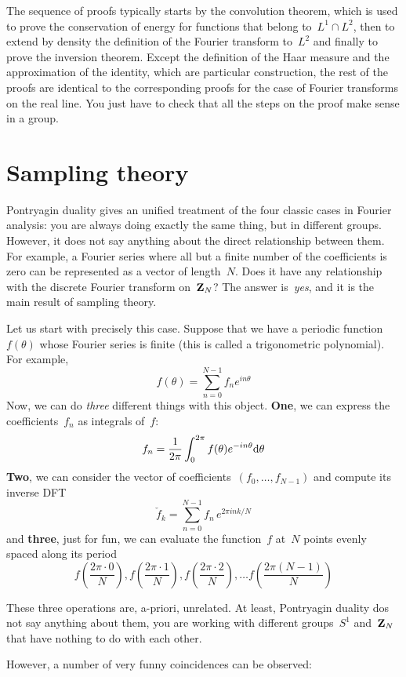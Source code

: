 The sequence of proofs typically starts by the convolution theorem,
which is used to prove the conservation of energy for functions that
belong to~$L^1\cap L^2$, then to extend by density the definition of
the Fourier transform to~$L^2$ and finally to prove the inversion
theorem.  Except the definition of the Haar measure and the
approximation of the identity, which are particular construction, the
rest of the proofs are identical to the corresponding proofs for the
case of Fourier transforms on the real line.  You just have to check
that all the steps on the proof make sense in a group.


\section{Sampling theory}

Pontryagin duality gives an unified treatment of the four classic
cases in Fourier analysis: you are always doing exactly the same
thing, but in different groups.  However, it does not say anything
about the direct relationship between them.  For example, a Fourier
series where all but a finite number of the coefficients is zero can
be represented as a vector of length~$N$.  Does it have any
relationship with the discrete Fourier transform on~$\mathbf{Z}_N$?  The
answer is~\emph{yes}, and it is the main result of sampling theory.

Let us start with precisely this case.  Suppose that we have a
periodic function~$f(\theta)$ whose Fourier series is finite (this is
called a trigonometric polynomial).  For
example,
$$
f(\theta)=\sum_{n=0}^{N-1} f_ne ^{in\theta}
$$
Now, we can do \emph{three} different things with this object.  {\bf
One}, we can express the coefficients~$f_n$ as integrals of~$f$:
$$
f_n = \frac{1}{2\pi}\int_0^{2\pi} f(\theta)e^{-in\theta}\mathrm{d}\theta
$$
{\bf Two}, we can consider the vector of
coefficients~$(f_0,\ldots,f_{N-1})$ and compute its inverse DFT
$$
\check{f}_k = \sum_{n=0}^{N-1} f_n\,e^{2\pi i nk/N}
$$
and {\bf three}, just for fun, we can evaluate the function~$f$
at~$N$ points evenly spaced along its period
$$
f\left(\frac{2\pi\cdot 0}{N}\right),
f\left(\frac{2\pi\cdot 1}{N}\right),
f\left(\frac{2\pi\cdot 2}{N}\right),
\ldots
f\left(\frac{2\pi(N-1)}{N}\right)
$$

These three operations are, a-priori, unrelated.  At least,
Pontryagin duality dos not say anything about them, you are
working with different groups~$S^1$ and~$\mathbf{Z}_N$ that have nothing to
do with each other.

However, a number of very funny coincidences can be observed:

